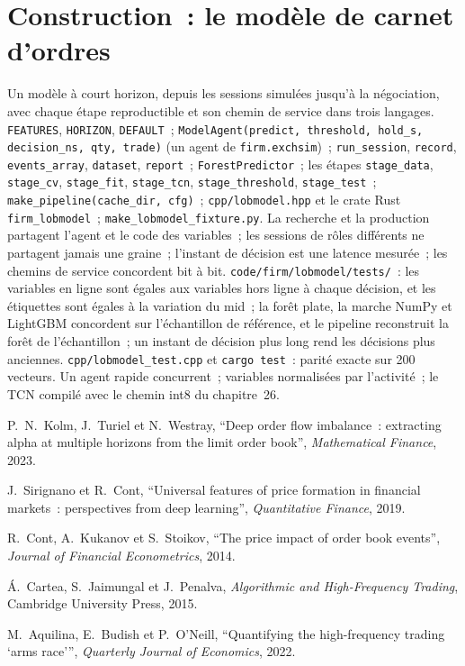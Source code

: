 \section{Construction~: le modèle de carnet d'ordres}\label{bld:ml:build-an-order-book-model-end-to-end:lobmodel}

\begin{build}
 Un modèle à court horizon, depuis les sessions simulées jusqu'à la négociation, avec chaque étape reproductible et son chemin de service dans
trois langages.
 \texttt{FEATURES}, \texttt{HORIZON}, \texttt{DEFAULT}~;
\texttt{ModelAgent(predict, threshold, hold\_s, decision\_ns, qty, trade)} (un agent de \texttt{firm.exchsim})~; \texttt{run\_session}, \texttt{record}, \texttt{events\_array},
\texttt{dataset}, \texttt{report}~; \texttt{ForestPredictor}~; les étapes \texttt{stage\_data}, \texttt{stage\_cv},
\texttt{stage\_fit}, \texttt{stage\_tcn}, \texttt{stage\_threshold}, \texttt{stage\_test}~;
\texttt{make\_pipeline(cache\_dir, cfg)}~; \texttt{cpp/lobmodel.hpp} et le crate Rust \texttt{firm\_lobmodel}~; \texttt{make\_lobmodel\_fixture.py}.
 La recherche et la production partagent l'agent et le code des variables~; les sessions de rôles différents ne partagent jamais une graine~;
l'instant de décision est une latence mesurée~; les chemins de service concordent bit à bit.
 \texttt{code/firm/lobmodel/tests/}~: les variables en ligne sont égales aux variables hors ligne à chaque décision, et les étiquettes
sont égales à la variation du mid~; la forêt plate, la marche NumPy et LightGBM concordent sur l'échantillon de référence, et le pipeline reconstruit la
forêt de l'échantillon~; un instant de décision plus long rend les décisions plus anciennes. \texttt{cpp/lobmodel\_test.cpp} et \texttt{cargo test}~: parité exacte sur
200 vecteurs.
 Un agent rapide concurrent~; variables normalisées par l'activité~; le TCN compilé avec le chemin int8 du chapitre~26.
\end{build}

\begin{omsources}
\item P.~N.~Kolm, J.~Turiel et N.~Westray, ``Deep order flow imbalance~: extracting alpha at multiple horizons from the limit
order book'', \emph{Mathematical Finance}, 2023.
\item J.~Sirignano et R.~Cont, ``Universal features of price formation in financial markets~: perspectives from deep learning'',
\emph{Quantitative Finance}, 2019.
\item R.~Cont, A.~Kukanov et S.~Stoikov, ``The price impact of order book events'', \emph{Journal of Financial Econometrics},
2014.
\item Á.~Cartea, S.~Jaimungal et J.~Penalva, \emph{Algorithmic and High-Frequency Trading}, Cambridge University Press, 2015.
\item M.~Aquilina, E.~Budish et P.~O'Neill, ``Quantifying the high-frequency trading `arms race''', \emph{Quarterly Journal of
Economics}, 2022.
\end{omsources}

